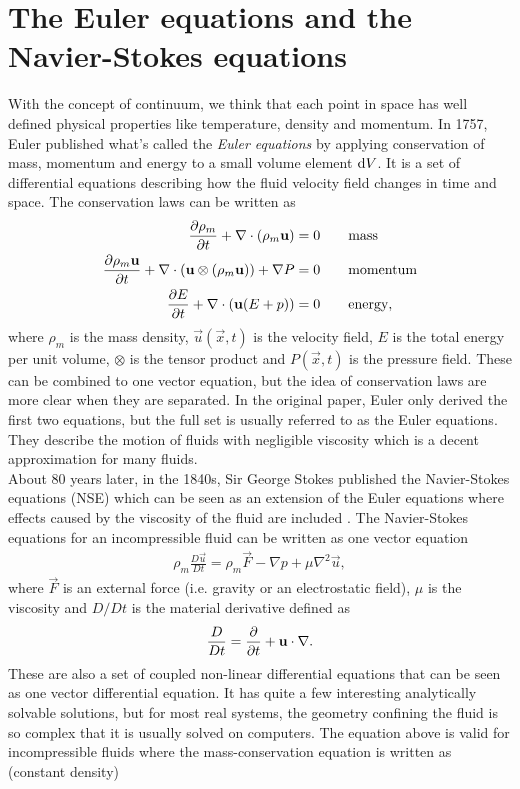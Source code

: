 \section{The Euler equations and the Navier-Stokes equations}
With the concept of continuum, we think that each point in space has well defined physical properties like temperature, density and momentum. In 1757, Euler published what's called the \textit{Euler equations} by applying conservation of mass, momentum and energy to a small volume element $\mathrm{d}V$. It is a set of differential equations describing how the fluid velocity field changes in time and space. The conservation laws can be written as
\begin{align}
	\frac{\partial \rho_m}{\partial t} + \nabla\cdot (\rho_m\mathbf u) &= 0 \qquad \text{mass}\\
	\frac{\partial \rho_m \mathbf u}{\partial t} + \nabla \cdot (\mathbf u \otimes (\rho_m\mathbf u)) + \nabla P &= 0\qquad \text{momentum}\\
	\frac{\partial E}{\partial t} + \nabla\cdot (\mathbf u(E + p)) &= 0\qquad \text{energy},
\end{align}
where $\rho_m$ is the mass density, $\vec u(\vec x, t)$ is the velocity field, $E$ is the total energy per unit volume, $\otimes$ is the tensor product and $P(\vec x, t)$ is the pressure field. These can be combined to one vector equation, but the idea of conservation laws are more clear when they are separated. In the original paper, Euler only derived the first two equations, but the full set is usually referred to as the Euler equations. They describe the motion of fluids with negligible viscosity which is a decent approximation for many fluids.\\
About 80 years later, in the 1840s, Sir George Stokes published the Navier-Stokes equations (NSE) which can be seen as an extension of the Euler equations where effects caused by the viscosity of the fluid are included \cite{batchelor2000introduction}. The Navier-Stokes equations for an incompressible fluid can be written as one vector equation
\begin{align}
	\label{eq:nse_incompressible}
	\rho_m \frac{D\vec u}{Dt} = \rho_m \vec F - \nabla p + \mu\nabla^2\vec u,
\end{align}
where $\vec F$ is an external force (i.e. gravity or an electrostatic field), $\mu$ is the viscosity and $D/Dt$ is the material derivative defined as
\begin{align}
	\frac{D}{Dt} = \frac{\partial }{\partial t} + \mathbf u\cdot \nabla.
\end{align}
These are also a set of coupled non-linear differential equations that can be seen as one vector differential equation. It has quite a few interesting analytically solvable solutions, but for most real systems, the geometry confining the fluid is so complex that it is usually solved on computers. The equation above is valid for incompressible fluids where the mass-conservation equation is written as (constant density)
